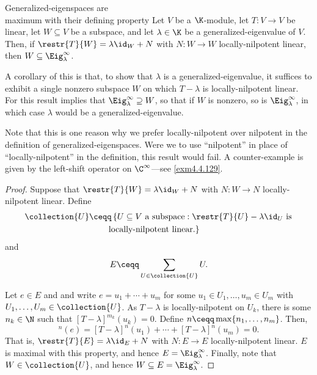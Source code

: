\begin{prp}{Generalized-eigenspaces are \\ maximum with their defining property}{}
	Let $V$ be a $\K$-module, let $T\colon V\rightarrow V$ be linear, let $W\subseteq V$ be a subspace, and let $\lambda \in \K$ be a generalized-eigenvalue of $V$.  Then, if $\restr{T}{W}=\lambda \id _W+N$ with $N\colon W\rightarrow W$ locally-nilpotent linear, then $W\subseteq \Eig _{\lambda}^{\infty}$.
	\begin{rmk}
		A corollary of this is that, to show that $\lambda$ is a generalized-eigenvalue, it suffices to exhibit a single nonzero subspace $W$ on which $T-\lambda$ is locally-nilpotent linear.  For this result implies that $\Eig _{\lambda}^{\infty}\supseteq W$, so that if $W$ is nonzero, so is $\Eig _{\lambda}^{\infty}$, in which case $\lambda$ would be a generalized-eigenvalue.
	\end{rmk}
	\begin{rmk}
		Note that this is one reason why we prefer locally-nilpotent over nilpotent in the definition of generalized-eigenspaces.  Were we to use ``nilpotent'' in place of ``locally-nilpotent'' in the definition, this result would fail.  A counter-example is given by the left-shift operator on $\C ^{\infty}$---see \cref{exm4.4.129}.
	\end{rmk}
	\begin{proof}
		Suppose that $\restr{T}{W}=\lambda \id _W+N$ with $N\colon W\rightarrow N$ locally-nilpotent linear.  Define
		\begin{equation}
			\begin{split}
				\collection{U} & \ceqq \left\{ U\subseteq V\text{ a subspace}:\restr{T}{U}-\lambda \id _U\text{ is}\right. \\ & \qquad \left. \text{locally-nilpotent linear.}\right\} 
			\end{split}
		\end{equation}
		and
		\begin{equation}
		E\ceqq \sum _{U\in \collection{U}}U.
		\end{equation}
		
		Let $e\in E$ and and write $e=u_1+\cdots +u_m$ for some $u_1\in U_1,\ldots ,u_m\in U_m$ with $U_1,\ldots ,U_m\in \collection{U}$.  As $T-\lambda$ is locally-nilpotent on $U_k$, there is some $n_k\in \N$ such that $[T-\lambda ]^{m_k}(u_k)=0$.  Define $n\ceqq \max \{ n_1,\ldots ,n_m\}$.  Then,
		\begin{equation}
			[T-\lambda ]^n(e)=[T-\lambda ]^n(u_1)+\cdots +[T-\lambda ]^n(u_m)=0.
		\end{equation}
		That is, $\restr{T}{E}=\lambda \id _E+N$ with $N\colon E\rightarrow E$ locally-nilpotent linear.  $E$ is maximal with this property, and hence $E=\Eig _{\lambda}^{\infty}$.  Finally, note that $W\in \collection{U}$, and hence $W\subseteq E=\Eig _{\lambda}^{\infty}$. 
	\end{proof}
\end{prp}
